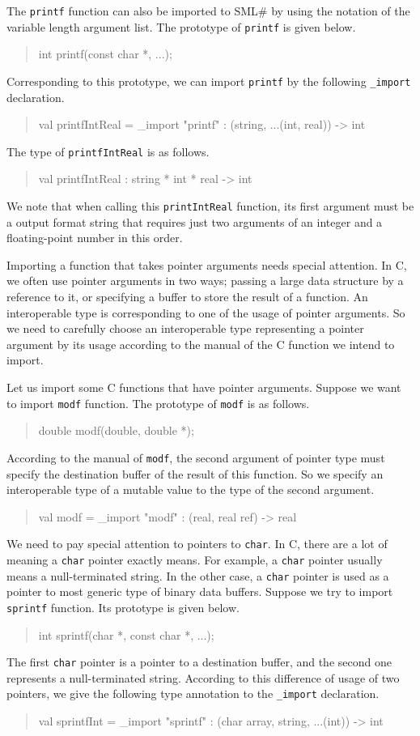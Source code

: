 \documentclass{jbook}
\newcommand{\smlsharp}{SML\#}
\newenvironment{program}{\begin{quote}\begin{tt}}%
                        {\end{tt}\end{quote}}
\begin{document}
	The {\tt printf} function can also be imported to \smlsharp{} by
using the notation of the variable length argument list.
	The prototype of {\tt printf} is given below.
\begin{program}
int printf(const char *, ...);
\end{program}
	Corresponding to this prototype, we can import {\tt printf} by
the following {\tt \_import} declaration.
\begin{program}
val printfIntReal = \_import "printf" : (string, ...(int, real)) -> int
\end{program}
	The type of {\tt printfIntReal} is as follows.
\begin{program}
val printfIntReal : string * int * real -> int
\end{program}
	We note that when calling this {\tt printIntReal} function, its
first argument must be a output format string that requires just two
arguments of an integer and a floating-point number in this order.

	Importing a function that takes pointer arguments needs special
attention.
	In C, we often use pointer arguments in two ways;
passing a large data structure by a reference to it, or
specifying a buffer to store the result of a function.
	An interoperable type is corresponding to one of the usage of
pointer arguments.
	So we need to carefully choose an interoperable type representing
a pointer argument by its usage according to the manual of the C function
we intend to import.

	Let us import some C functions that have pointer arguments.
	Suppose we want to import {\tt modf} function.
	The prototype of {\tt modf} is as follows.
\begin{program}
double modf(double, double *);
\end{program}
	According to the manual of {\tt modf}, the second argument of pointer
type must specify the destination buffer of the result of this function.
	So we specify an interoperable type of a mutable value to the type
of the second argument.
\begin{program}
val modf = \_import "modf" : (real, real ref) -> real
\end{program}
	We need to pay special attention to pointers to {\tt char}.
	In C, there are a lot of meaning a {\tt char} pointer exactly means.
	For example, a {\tt char} pointer usually means a null-terminated
string.
	In the other case, a {\tt char} pointer is used as a pointer to
most generic type of binary data buffers.
	Suppose we try to import {\tt sprintf} function.
	Its prototype is given below.
\begin{program}
int sprintf(char *, const char *, ...);
\end{program}
	The first {\tt char} pointer is a pointer to a destination buffer,
and the second one represents a null-terminated string.
	According to this difference of usage of two pointers, we give
the following type annotation to the {\tt \_import} declaration.
\begin{program}
val sprintfInt = \_import "sprintf" : (char array, string, ...(int)) -> int
\end{program}
\end{document}
